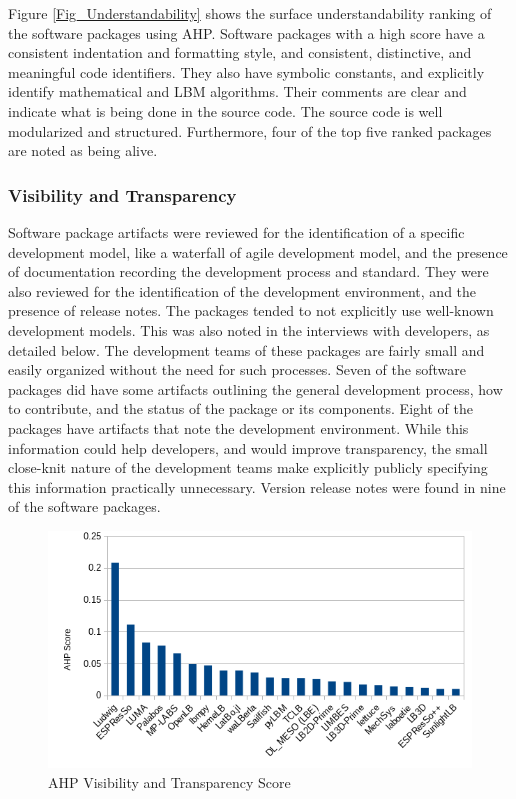 \documentclass[12pt, notitlepage]{article}
\begin{document}
Figure \ref{Fig_Understandability} shows the surface understandability ranking of the software packages using AHP. Software packages with a high score have a consistent indentation and formatting style, and consistent, distinctive, and meaningful code identifiers. They also have symbolic constants, and explicitly identify mathematical and LBM algorithms. Their comments are clear and indicate what is being done in the source code. The source code is well modularized and structured. Furthermore, four of the top five ranked packages are noted as being alive.

\subsubsection{Visibility and Transparency}

Software package artifacts were reviewed for the identification of a specific development model, like a waterfall of agile development model, and the presence of documentation recording the development process and standard. They were also reviewed for the identification of the development environment, and the presence of release notes. The packages tended to not explicitly use well-known development models. This was also noted in the interviews with developers, as detailed below. The development teams of these packages are fairly small and easily organized without the need for such processes. Seven of the software packages did have some artifacts outlining the general development process, how to contribute, and the status of the package or its components. Eight of the packages have artifacts that note the development environment. While this information could help developers, and would improve transparency, the small close-knit nature of the development teams make explicitly publicly specifying this information practically unnecessary. Version release notes were found in nine of the software packages.

\begin{figure}[h!]
	\begin{center}
		\includegraphics[width=1.0\textwidth]{visibilitytransparency_chart}
		\caption{AHP Visibility and Transparency Score}
		\label{Fig_VisibilityTransparency}
	\end{center}
\end{figure}
\end{document}
